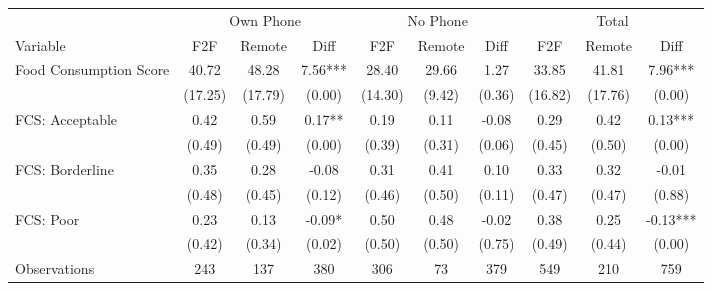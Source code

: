 \begin{tabular}{l*{9}c}
\hline\hline
 & \multicolumn{3}{c}{Own Phone} & \multicolumn{3}{c}{No Phone} & \multicolumn{3}{c}{Total}\\ 
Variable & F2F & Remote & Diff & F2F & Remote & Diff & F2F & Remote & Diff \\
\hline
Food Consumption Score&40.72&48.28&7.56***&28.40&29.66&1.27&33.85&41.81&7.96***\\
&(17.25)&(17.79)&(0.00)&(14.30)&(9.42)&(0.36)&(16.82)&(17.76)&(0.00)\\
FCS: Acceptable&0.42&0.59&0.17**&0.19&0.11&-0.08&0.29&0.42&0.13***\\
&(0.49)&(0.49)&(0.00)&(0.39)&(0.31)&(0.06)&(0.45)&(0.50)&(0.00)\\
FCS: Borderline&0.35&0.28&-0.08&0.31&0.41&0.10&0.33&0.32&-0.01\\
&(0.48)&(0.45)&(0.12)&(0.46)&(0.50)&(0.11)&(0.47)&(0.47)&(0.88)\\
FCS: Poor&0.23&0.13&-0.09*&0.50&0.48&-0.02&0.38&0.25&-0.13***\\
&(0.42)&(0.34)&(0.02)&(0.50)&(0.50)&(0.75)&(0.49)&(0.44)&(0.00)\\
\hline
Observations & 243 & 137 & 380 & 306 & 73 & 379 & 549 & 210 & 759 \\
\hline\hline
\end{tabular}
